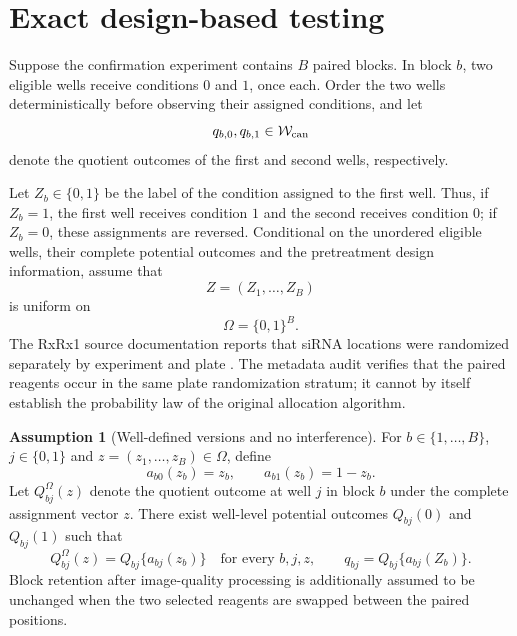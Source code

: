 \documentclass[11pt]{article}
\theoremstyle{plain}
\theoremstyle{definition}
\newtheorem{assumption}[theorem]{Assumption}
\numberwithin{equation}{section}
\newcommand{\1}{\mathbf 1}
\newcommand{\calW}{\mathcal W}
\begin{document}
\section{Exact design-based testing}\label{sec:randomization}

Suppose the confirmation experiment contains $B$ paired blocks. In
block $b$, two eligible wells receive conditions $0$ and $1$, once
each. Order the two wells deterministically before observing their
assigned conditions, and let
\[
q_{b,0},q_{b,1}\in\calW_{\rm can}
\]
denote the quotient outcomes of the first and second wells,
respectively.

Let $Z_b\in\{0,1\}$ be the label of the condition assigned to the
first well. Thus, if $Z_b=1$, the first well receives condition $1$
and the second receives condition $0$; if $Z_b=0$, these assignments
are reversed. Conditional on the unordered eligible wells, their
complete potential outcomes and the pretreatment design information,
assume that
\[
Z=(Z_1,\ldots,Z_B)
\]
is uniform on
\[
\Omega=\{0,1\}^B.
\]
The RxRx1 source documentation reports that siRNA locations were randomized
separately by experiment and plate \citep{Sypetkowski2023}. The metadata audit
verifies that the paired reagents occur in the same plate randomization stratum;
it cannot by itself establish the probability law of the original allocation
algorithm.

\begin{assumption}[Well-defined versions and no interference]
\label{ass:pair-sutva}
For $b\in\{1,\ldots,B\}$, $j\in\{0,1\}$ and
$z=(z_1,\ldots,z_B)\in\Omega$, define
\[
a_{b0}(z_b)=z_b,
\qquad
a_{b1}(z_b)=1-z_b.
\]
Let $Q_{bj}^{\Omega}(z)$ denote the quotient outcome at well $j$ in block $b$
under the complete assignment vector $z$. There exist well-level potential
outcomes $Q_{bj}(0)$ and $Q_{bj}(1)$ such that
\begin{equation}\label{eq:pair-sutva}
Q_{bj}^{\Omega}(z)=Q_{bj}\{a_{bj}(z_b)\}
\quad\text{for every }b,j,z,
\qquad
q_{bj}=Q_{bj}\{a_{bj}(Z_b)\}.
\end{equation}
Block retention after image-quality processing is additionally assumed to be
unchanged when the two selected reagents are swapped between the paired
positions.
\end{assumption}
\end{document}
